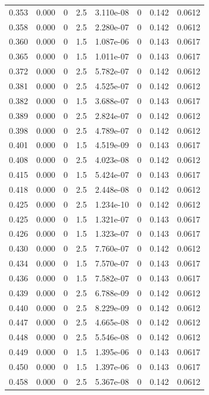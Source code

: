 \documentclass[preview]{standalone}
\begin{document}
{{{\begin{tabular}{L{1.2cm}C{1.2cm} C{0.3cm}C{0.5cm} C{1.4cm}C{1.4cm} C{1.4cm}C{1.4cm}}
  0.353  &  0.000  & 0     & 2.5 &  3.110e-08  & 0  & 0.142 &  0.0612   \\ 
  0.358  &  0.000  & 0     & 2.5 &  2.280e-07  & 0  & 0.142 &  0.0612   \\ 
  0.360  &  0.000  & 0     & 1.5 &  1.087e-06  & 0  & 0.143 &  0.0617   \\ 
  0.365  &  0.000  & 0     & 1.5 &  1.011e-07  & 0  & 0.143 &  0.0617   \\ 
  0.372  &  0.000  & 0     & 2.5 &  5.782e-07  & 0  & 0.142 &  0.0612   \\ 
  0.381  &  0.000  & 0     & 2.5 &  4.525e-07  & 0  & 0.142 &  0.0612   \\ 
  0.382  &  0.000  & 0     & 1.5 &  3.688e-07  & 0  & 0.143 &  0.0617   \\ 
  0.389  &  0.000  & 0     & 2.5 &  2.824e-07  & 0  & 0.142 &  0.0612   \\ 
  0.398  &  0.000  & 0     & 2.5 &  4.789e-07  & 0  & 0.142 &  0.0612   \\ 
  0.401  &  0.000  & 0     & 1.5 &  4.519e-09  & 0  & 0.143 &  0.0617   \\ 
  0.408  &  0.000  & 0     & 2.5 &  4.023e-08  & 0  & 0.142 &  0.0612   \\ 
  0.415  &  0.000  & 0     & 1.5 &  5.424e-07  & 0  & 0.143 &  0.0617   \\ 
  0.418  &  0.000  & 0     & 2.5 &  2.448e-08  & 0  & 0.142 &  0.0612   \\ 
  0.425  &  0.000  & 0     & 2.5 &  1.234e-10  & 0  & 0.142 &  0.0612   \\ 
  0.425  &  0.000  & 0     & 1.5 &  1.321e-07  & 0  & 0.143 &  0.0617   \\ 
  0.426  &  0.000  & 0     & 1.5 &  1.323e-07  & 0  & 0.143 &  0.0617   \\ 
  0.430  &  0.000  & 0     & 2.5 &  7.760e-07  & 0  & 0.142 &  0.0612   \\ 
  0.434  &  0.000  & 0     & 1.5 &  7.570e-07  & 0  & 0.143 &  0.0617   \\ 
  0.436  &  0.000  & 0     & 1.5 &  7.582e-07  & 0  & 0.143 &  0.0617   \\ 
  0.439  &  0.000  & 0     & 2.5 &  6.788e-09  & 0  & 0.142 &  0.0612   \\ 
  0.440  &  0.000  & 0     & 2.5 &  8.229e-09  & 0  & 0.142 &  0.0612   \\ 
  0.447  &  0.000  & 0     & 2.5 &  4.665e-08  & 0  & 0.142 &  0.0612   \\ 
  0.448  &  0.000  & 0     & 2.5 &  5.546e-08  & 0  & 0.142 &  0.0612   \\ 
  0.449  &  0.000  & 0     & 1.5 &  1.395e-06  & 0  & 0.143 &  0.0617   \\ 
  0.450  &  0.000  & 0     & 1.5 &  1.397e-06  & 0  & 0.143 &  0.0617   \\ 
  0.458  &  0.000  & 0     & 2.5 &  5.367e-08  & 0  & 0.142 &  0.0612   \\ 
\hline 
\end{tabular} 

}}}
\end{document}
